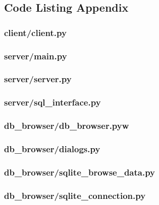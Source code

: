 \documentclass[a4paper]{article}
\begin{document}
\subsection{Code Listing Appendix}
\newpage
\subsubsection{client/client.py}
\label{sec:client.py}


\subsubsection{server/main.py}
\label{sec:main.py}


\subsubsection{server/server.py}
\label{sec:server.py}


\subsubsection{server/sql\_interface.py}
\label{sec:sqlinterface.py}


\subsubsection{db\_browser/db\_browser.pyw}
\label{sec:dbbrowser.py}


\subsubsection{db\_browser/dialogs.py}
\label{sec:dialogs.py}


\subsubsection{db\_browser/sqlite\_browse\_data.py}
\label{sec:browsedata.py}


\subsubsection{db\_browser/sqlite\_connection.py}
\label{sec:connection.py}

\end{document}
